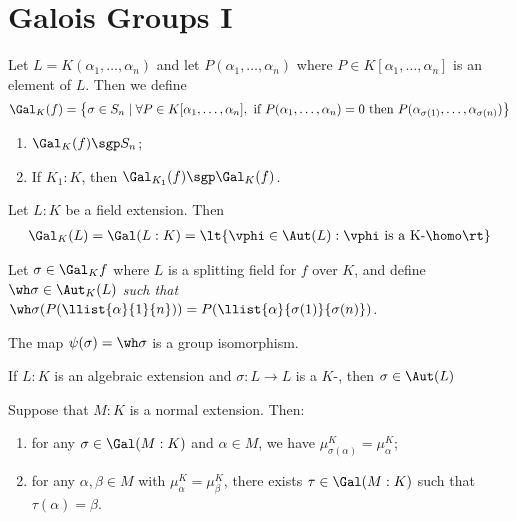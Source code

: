 \documentclass[a4paper]{article}
\begin{document}
\section{Galois Groups I}
\begin{tdefinition}
  Let \( L=K(\alpha_1,\ldots,\alpha_n) \) and let \( P(\alpha_1,\ldots,\alpha_n) \) where \( P\in K[\alpha_1,\ldots,\alpha_n] \) is an element of \( L \).
  Then we define \begin{align*}
    \Gal_K(f)=\left\{\sigma\in S_n\mid \forall P\in K[\alpha_1,\ldots,\alpha_n], \text{ if } P(\alpha_1,\ldots,\alpha_n)=0 \text{ then } P(\alpha_{\sigma(1)},\ldots,\alpha_{\sigma(n)})\right\}
  \end{align*}
\end{tdefinition}

\begin{tlemma}
\begin{enumerate}
  \item \( \Gal_K(f) \sgp S_n \);
  \item If \( K_1:K \), then \( \Gal_{K_1}(f)\sgp \Gal_K(f) \).
\end{enumerate}
\end{tlemma}

\begin{tdefinition}
  Let \( L:K \) be a field extension.
  Then \begin{align*}
    \Gal_K(L) = \Gal(L:K) = \lt\{ \vphi\in\Aut(L) : \vphi\text{ is a K-\homo} \rt\}
  \end{align*}
\end{tdefinition}

\begin{tdefinition}
  Let \( \sigma\in \Gal_K f \) where \( L \) is a splitting field for \( f \) over \( K \), and define \it{\( \wh\sigma\in\Aut_K(L) \)} such that \( \wh\sigma(P(\llist{\alpha}{1}{n})) = P(\llist{\alpha}{\sigma(1)}{\sigma(n)}) \).
\end{tdefinition}

\begin{tlemma}
  The map \( \psi(\sigma)=\wh\sigma \) is a group isomorphism.
\end{tlemma}

\begin{ttheorem}
  If \( L:K \) is an algebraic extension and \( \sigma:L\to L \) is a \( K \)-\homo, then \( \sigma\in\Aut(L) \)
\end{ttheorem}

\begin{tlemma}
  Suppose that \( M:K \) is a normal extension.
  Then: \begin{enumerate}[label=(\alph*)]
    \item for any \( \sigma\in\Gal(M:K) \) and \( \alpha\in M \), we have \( \mu_{\sigma(\alpha)}^K=\mu_\alpha^K \);
    \item for any \( \alpha,\beta\in M \) with \( \mu_\alpha^K=\mu_\beta^K \), there exists \( \tau\in\Gal(M:K) \) such that \( \tau(\alpha)=\beta \).
  \end{enumerate}
\end{tlemma}
\end{document}
